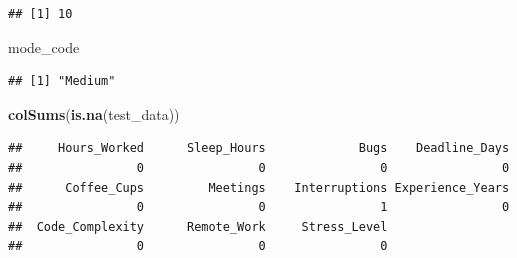 \documentclass[
]{article}
\newenvironment{Shaded}{\begin{snugshade}}{\end{snugshade}}
\newcommand{\DocumentationTok}[1]{\textcolor[rgb]{0.56,0.35,0.01}{\textbf{\textit{#1}}}}
\newcommand{\FunctionTok}[1]{\textcolor[rgb]{0.13,0.29,0.53}{\textbf{#1}}}
\newcommand{\NormalTok}[1]{#1}
\newcommand{\OtherTok}[1]{\textcolor[rgb]{0.56,0.35,0.01}{#1}}
\newcommand{\SpecialCharTok}[1]{\textcolor[rgb]{0.81,0.36,0.00}{\textbf{#1}}}
\begin{document}
\begin{verbatim}
## [1] 10
\end{verbatim}

\begin{Shaded}
\begin{Highlighting}[]
\NormalTok{mode\_code}
\end{Highlighting}
\end{Shaded}

\begin{verbatim}
## [1] "Medium"
\end{verbatim}

\begin{Shaded}
\end{Shaded}

\begin{Shaded}
\begin{Highlighting}[]
\FunctionTok{colSums}\NormalTok{(}\FunctionTok{is.na}\NormalTok{(test\_data))}
\end{Highlighting}
\end{Shaded}

\begin{verbatim}
##     Hours_Worked      Sleep_Hours             Bugs    Deadline_Days 
##                0                0                0                0 
##      Coffee_Cups         Meetings    Interruptions Experience_Years 
##                0                0                1                0 
##  Code_Complexity      Remote_Work     Stress_Level 
##                0                0                0
\end{verbatim}
\end{document}
